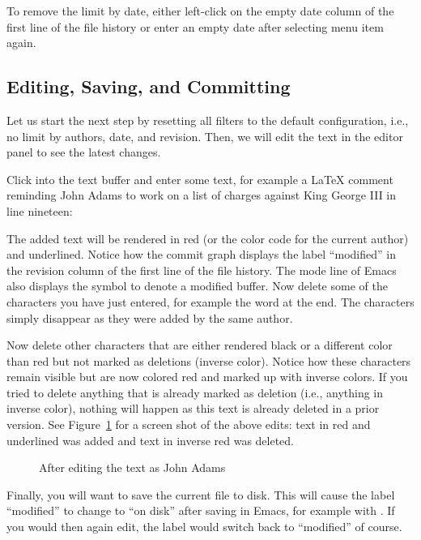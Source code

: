 To remove the limit by date, either left-click on the empty date column of the first line of the file history or enter an empty date after selecting menu item  again.

\subsection{Editing, Saving, and Committing}

Let us start the next step by resetting all filters to the default configuration, i.e., no limit by authors, date, and revision.  Then, we will edit the text in the editor panel to see the latest changes.

Click into the text buffer and enter some text, for example a LaTeX comment reminding John Adams to work on a list of charges against King George III in line nineteen:
\begin{FileVerbatim}
\end{FileVerbatim}
The added text will be rendered in red (or the color code for the current author) and underlined.  Notice how the commit graph displays the label ``modified'' in the revision column of the first line of the file history.  The mode line of Emacs also displays the symbol \Code{**} to denote a modified buffer. Now delete some of the characters you have just entered, for example the word  at the end.  The characters simply disappear as they were added by the same author.

Now delete other characters that are either rendered black or a different color than red but not marked as deletions (inverse color).  Notice how these characters remain visible but are now colored red and marked up with inverse colors.  If you tried to delete anything that is already marked as deletion (i.e., anything in inverse color), nothing will happen as this text is already deleted in a prior version.  See Figure~\ref{fig:emacs-modified} for a screen shot of the above edits: text in red and underlined was added and text in inverse red was deleted.

\begin{figure}[t]
\centering
{}
\caption{After editing the text as John Adams} \label{fig:emacs-modified}
\end{figure}

Finally, you will want to save the current file to disk.  This will cause the label ``modified'' to change to ``on disk'' after saving in Emacs, for example with .  If you would then again edit, the label would switch back to ``modified'' of course.

